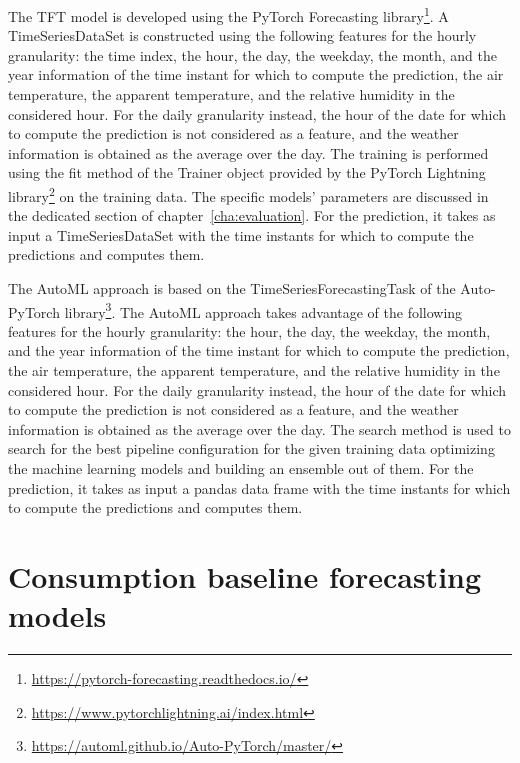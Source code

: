 The TFT model is developed using the PyTorch Forecasting library\footnote{ \url{https://pytorch-forecasting.readthedocs.io/} }.
A TimeSeriesDataSet is constructed using the following features for the hourly granularity: the time index, the hour, the day, the weekday, the month, and the year information of the time instant for which to compute the prediction, the air temperature, the apparent temperature, and the relative humidity in the considered hour.
For the daily granularity instead, the hour of the date for which to compute the prediction is not considered as a feature, and the weather information is obtained as the average over the day.
The training is performed using the fit method of the Trainer object provided by the PyTorch Lightning library\footnote{ \url{https://www.pytorchlightning.ai/index.html} } on the training data.
The specific models’ parameters are discussed in the dedicated section of chapter~\ref{cha:evaluation}.
For the prediction, it takes as input a TimeSeriesDataSet with the time instants for which to compute the predictions and computes them.

The AutoML approach is based on the TimeSeriesForecastingTask of the Auto-PyTorch library\footnote{ \url{https://automl.github.io/Auto-PyTorch/master/} }.
The AutoML approach takes advantage of the following features for the hourly granularity: the hour, the day, the weekday, the month, and the year information of the time instant for which to compute the prediction, the air temperature, the apparent temperature, and the relative humidity in the considered hour.
For the daily granularity instead, the hour of the date for which to compute the prediction is not considered as a feature, and the weather information is obtained as the average over the day.
The search method is used to search for the best pipeline configuration for the given training data optimizing the machine learning models and building an ensemble out of them.
For the prediction, it takes as input a pandas data frame with the time instants for which to compute the predictions and computes them.


\section{Consumption baseline forecasting models}
\label{sec:baselineimpl}
\vspace{0.2 cm}

